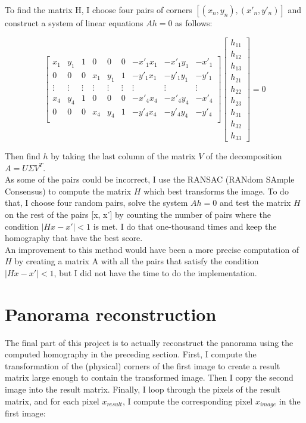 \documentclass[a4paper,twocolumn]{article}
\begin{document}
To find the matrix H, I choose four pairs of corners $[(x_n, y_n), (x'_n, y'_n)]$ and construct a system of linear equations $Ah = 0$ as follows:

$$
\begin{bmatrix}
x_1 & y_1 & 1 & 0 & 0 & 0 & -x'_1 x_1 & -x'_1 y_1 & -x'_1 \\
0 & 0 & 0 & x_1 & y_1 & 1 & -y'_1 x_1 & -y'_1 y_1 & -y'_1 \\
\vdots & \vdots & \vdots & \vdots & \vdots & \vdots & \vdots & \vdots & \vdots \\
x_4 & y_4 & 1 & 0 & 0 & 0 & -x'_4 x_4 & -x'_4 y_4 & -x'_4 \\
0 & 0 & 0 & x_4 & y_4 & 1 & -y'_4 x_4 & -y'_4 y_4 & -y'_4 \\
\end{bmatrix}
\begin{bmatrix}
h_{11} \\
h_{12} \\
h_{13} \\
h_{21} \\
h_{22} \\
h_{23} \\
h_{31} \\
h_{32} \\
h_{33}
\end{bmatrix}
= 0
$$

Then find $h$ by taking the last column of the matrix $V$ of the decomposition $A = U \Sigma V^T$.
\\

As some of the pairs could be incorrect, I use the RANSAC (RANdom SAmple Consensus) to compute the matrix $H$ which best transforms the image. To do that, I choose four random pairs, solve the system $Ah = 0$ and test the matrix $H$ on the rest of the pairs [x, x'] by counting the number of pairs where the condition $|Hx - x'| < 1$ is met. I do that one-thousand times and keep the homography that have the best score.
\\

An improvement to this method would have been a more precise computation of $H$ by creating a matrix A with all the pairs that satisfy the condition $|Hx - x'| < 1$, but I did not have the time to do the implementation.

\section{Panorama reconstruction}

The final part of this project is to actually reconstruct the panorama using the computed homography in the preceding section. First, I compute the transformation of the (physical) corners of the first image to create a result matrix large enough to contain the transformed image. Then I copy the second image into the result matrix. Finally, I loop through the pixels of the result matrix, and for each pixel $x_{result}$, I compute the corresponding pixel $x_{image}$ in the first image:
\end{document}
